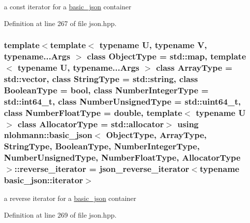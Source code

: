 a const iterator for a \hyperlink{classnlohmann_1_1basic__json}{basic\+\_\+json} container 



Definition at line 267 of file json.\+hpp.

\hypertarget{classnlohmann_1_1basic__json_a2f1f83aa187a56dc5ec7a7027065ac8a}{}
\subsubsection[{reverse\+\_\+iterator}]{\setlength{\rightskip}{0pt plus 5cm}template$<$template$<$ typename U, typename V, typename...\+Args $>$ class Object\+Type = std\+::map, template$<$ typename U, typename...\+Args $>$ class Array\+Type = std\+::vector, class String\+Type  = std\+::string, class Boolean\+Type  = bool, class Number\+Integer\+Type  = std\+::int64\+\_\+t, class Number\+Unsigned\+Type  = std\+::uint64\+\_\+t, class Number\+Float\+Type  = double, template$<$ typename U $>$ class Allocator\+Type = std\+::allocator$>$ using {\bf nlohmann\+::basic\+\_\+json}$<$ Object\+Type, Array\+Type, String\+Type, Boolean\+Type, Number\+Integer\+Type, Number\+Unsigned\+Type, Number\+Float\+Type, Allocator\+Type $>$\+::{\bf reverse\+\_\+iterator} =  {\bf json\+\_\+reverse\+\_\+iterator}$<$typename {\bf basic\+\_\+json\+::iterator}$>$}\label{classnlohmann_1_1basic__json_a2f1f83aa187a56dc5ec7a7027065ac8a}


a reverse iterator for a \hyperlink{classnlohmann_1_1basic__json}{basic\+\_\+json} container 



Definition at line 269 of file json.\+hpp.

\hypertarget{classnlohmann_1_1basic__json_ae336fff01f4b78e3e16e5008dc8dbc00}{}
